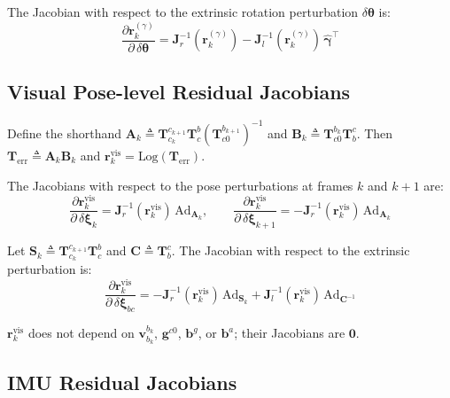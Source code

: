 The Jacobian with respect to the extrinsic rotation perturbation $\delta\boldsymbol{\theta}$ is:
\begin{equation}
\frac{\partial \mathbf{r}^{(\gamma)}_k}{\partial\,\delta\boldsymbol{\theta}}
=
\mathbf{J}_r^{-1}(\mathbf{r}^{(\gamma)}_k)
-
\mathbf{J}_l^{-1}(\mathbf{r}^{(\gamma)}_k)\,\hat{\boldsymbol{\gamma}}^\top
\end{equation}


\subsection{Visual Pose-level Residual Jacobians}

Define the shorthand
$\mathbf{A}_k \triangleq
\mathbf{T}_{c_k}^{c_{k+1}}\mathbf{T}_c^b(\mathbf{T}_{c0}^{b_{k+1}})^{-1}$
and
$\mathbf{B}_k \triangleq \mathbf{T}_{c0}^{b_k}\mathbf{T}_b^c$.
Then
$\mathbf{T}_{\mathrm{err}} \triangleq \mathbf{A}_k\mathbf{B}_k$
and
$\mathbf{r}^{\mathrm{vis}}_k=\text{Log}(\mathbf{T}_{\mathrm{err}})$.

The Jacobians with respect to the pose perturbations at frames $k$ and $k{+}1$ are:
\begin{equation}
\frac{\partial \mathbf{r}^{\mathrm{vis}}_k}{\partial\,\delta\boldsymbol{\xi}_k}
=
\mathbf{J}_r^{-1}(\mathbf{r}^{\mathrm{vis}}_k)\,\mathrm{Ad}_{\mathbf{A}_k},
\qquad
\frac{\partial \mathbf{r}^{\mathrm{vis}}_k}{\partial\,\delta\boldsymbol{\xi}_{k+1}}
=
-\mathbf{J}_r^{-1}(\mathbf{r}^{\mathrm{vis}}_k)\,\mathrm{Ad}_{\mathbf{A}_k}
\end{equation}

Let $\mathbf{S}_k \triangleq \mathbf{T}_{c_k}^{c_{k+1}}\mathbf{T}_c^b$ and $\mathbf{C} \triangleq \mathbf{T}_b^c$. The Jacobian with respect to the extrinsic perturbation is:
\begin{equation}
\frac{\partial \mathbf{r}^{\mathrm{vis}}_k}{\partial\,\delta\boldsymbol{\xi}_{bc}}
=
-\mathbf{J}_r^{-1}(\mathbf{r}^{\mathrm{vis}}_k)\,\mathrm{Ad}_{\mathbf{S}_k}
+\mathbf{J}_l^{-1}(\mathbf{r}^{\mathrm{vis}}_k)\,\mathrm{Ad}_{\mathbf{C}^{-1}}
\end{equation}

$\mathbf{r}^{\mathrm{vis}}_k$ does not depend on $\mathbf{v}_{b_k}^{b_k}$, $\mathbf{g}^{c0}$, $\mathbf{b}^g$, or $\mathbf{b}^a$; their Jacobians are $\mathbf{0}$.


\subsection{IMU Residual Jacobians}

